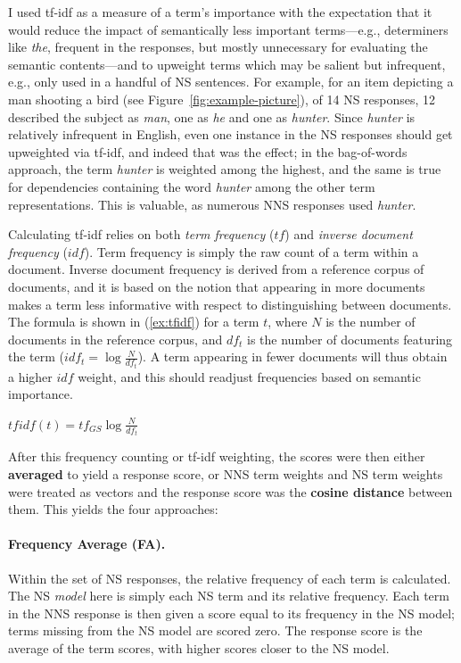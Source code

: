 I used tf-idf as a measure of a term's importance with the expectation that it would reduce the impact
of semantically less important terms---e.g., determiners like
\textit{the}, frequent in the responses, but mostly unnecessary for evaluating the
semantic contents---and to upweight terms which may
be salient but infrequent, e.g., only used in a handful of NS
sentences. For example, for an item depicting a man shooting a bird
(see Figure~\ref{fig:example-picture}), of 14 NS responses, 12 described the subject as \textit{man}, one as \textit{he} and one as
\textit{hunter}. Since \textit{hunter} is relatively infrequent in English, even
one instance in the NS responses should get upweighted via tf-idf, and indeed
that was the effect; in the bag-of-words approach, the term \textit{hunter} is weighted among the highest, and the same is true for dependencies containing the word \textit{hunter} among the other term representations. This is valuable, as numerous NNS responses used \textit{hunter}.

Calculating tf-idf relies on both \emph{term frequency} ($tf$) and
\emph{inverse document frequency} ($idf$).  Term frequency is simply
the raw count of a term within a document. Inverse document frequency is derived from a reference corpus of documents, and it is based on the notion that appearing in more documents makes a term less informative with respect
to distinguishing between documents.  The formula is shown in
(\ref{ex:tfidf}) for a term $t$, where $N$ is the number of documents
in the reference corpus, and $df_{t}$ is the number of documents
featuring the term ($idf_{t} = \log \frac{N}{df_{t}}$).  A term
appearing in fewer documents will thus obtain a higher $idf$ weight,
and this should readjust frequencies based on semantic importance.

\begin{exe}
\ex\label{ex:tfidf} $tfidf(t) = tf_{GS} \log \frac{N}{df_{t}}$
\end{exe}

After this frequency counting or tf-idf weighting, the scores were then either
\textbf{averaged} to yield a response score, or NNS term
weights and NS term weights were treated as vectors and the response
score was the \textbf{cosine distance} between them.  This
yields the four approaches:

\paragraph{Frequency Average (FA).} 
Within the set of NS responses, the relative frequency of each term is calculated. The NS \textit{model} here is simply each NS term and its relative frequency. Each term in
the NNS response is then given a score equal to its frequency in the
NS model; terms missing from the NS model are scored zero. The response score is
the average of the term scores, with higher scores closer to the NS model.

